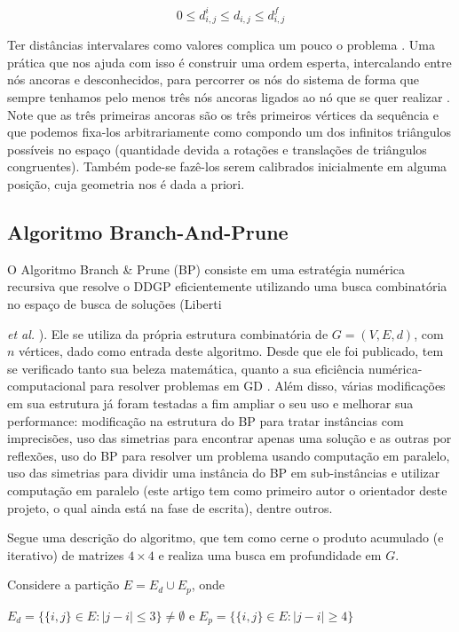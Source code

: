 \documentclass[11pt]{article}
\begin{document}
{$$ 0 \leq d_{i,j}^i \leq d_{i,j} \leq d_{i,j}^f$$

Ter distâncias intervalares como valores complica um pouco o problema \cite{iBPCarlile}. Uma prática que nos ajuda com isso é construir uma ordem esperta, intercalando entre nós ancoras e desconhecidos, para percorrer os nós do sistema de forma que sempre tenhamos pelo menos três nós ancoras ligados ao nó que se quer realizar \cite{carlile:MinimalOrder}. Note que as três primeiras ancoras são os três primeiros vértices da sequência e que podemos fixa-los arbitrariamente como compondo um dos infinitos triângulos possíveis no espaço (quantidade devida a rotações e translações de triângulos congruentes). Também pode-se fazê-los serem calibrados inicialmente em alguma posição, cuja geometria nos é dada a priori.

\subsection{Algoritmo Branch-And-Prune}

O Algoritmo Branch \& Prune (BP) consiste em uma estratégia numérica recursiva que resolve o DDGP eficientemente utilizando uma busca combinatória no espaço de busca de soluções (Liberti {\emph{et al.} \cite{Liberti:08}). Ele se utiliza da própria estrutura combinatória de $G = (V,E,d)$, com $n$ vértices, dado como entrada deste algoritmo. Desde que ele foi publicado, tem se verificado tanto sua beleza matemática, quanto a sua eficiência numérica-computacional para resolver problemas em GD \cite{LavorCOAP:12}. Além disso, várias modificações em sua estrutura já foram testadas a fim ampliar o seu uso e melhorar sua performance:  modificação na estrutura do BP para tratar instâncias com imprecisões, uso das simetrias para encontrar apenas uma solução e as outras por reflexões, uso do BP para resolver um problema usando computação em paralelo, uso das simetrias para dividir uma instância do BP em sub-instâncias e utilizar computação em paralelo (este artigo tem como primeiro autor o orientador deste projeto, o qual ainda está na fase de escrita), dentre outros.

Segue uma descrição do algoritmo, que tem como cerne o produto acumulado (e iterativo) de matrizes $4 \times 4$ e realiza uma busca em profundidade em $G$.

Considere a partição $E = E_{d} \cup E_{p}$, onde \vspace{-0.2cm}
\begin{center}
$E_{d} = \{\{i,j\} \in E: |j-i|\leq 3\} \neq \emptyset$ e $E_{p} = \{\{i,j\} \in E: |j-i|\geq 4\}$ \end{center}

}}
\end{document}
